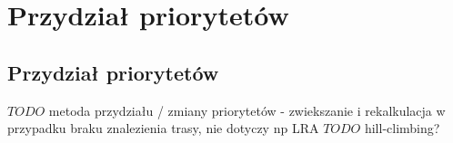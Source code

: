 \chapter{Przydział priorytetów}
\label{ch:priorities}

\section{Przydział priorytetów}
$TODO$ metoda przydziału / zmiany priorytetów - zwiekszanie i rekalkulacja w przypadku braku znalezienia trasy, nie dotyczy np LRA
$TODO$ hill-climbing?